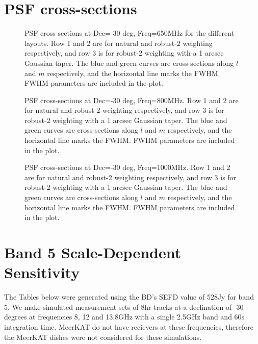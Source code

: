 \documentclass[sfheadings,a4paper,times,9pt,floats,floatfix]{article}
\begin{document}
\section{PSF cross-sections}\label{app:psf}
\begin{figure}[H]
 \tiny{}
 \caption{PSF cross-sections at Dec=-30 deg, Freq=650MHz for the different layouts. Row 1 and 2 are for natural and robust-2
weighting respectively, and row
3 is for robust-2 weighting with a 1 arcsec Gaussian taper. The blue and green curves are cross-sections along $l$ and $m$
respectively, and the horizontal line marks the FWHM. FWHM parameters are included in the plot.}
\end{figure}
\begin{figure}[H]
 \tiny{}
 \caption{PSF cross-sections at Dec=-30 deg, Freq=800MHz. Row 1 and 2 are for natural and robust-2 weighting respectively, and 
row
3 is for robust-2 weighting with a 1 arcsec Gaussian taper. The blue and green curves are cross-sections along $l$ and $m$
respectively, and the horizontal line marks the FWHM. FWHM parameters are included in the plot.}
\end{figure}
\begin{figure}[H]
 \tiny{}
 \caption{PSF cross-sections at Dec=-30 deg, Freq=1000MHz. Row 1 and 2 are for natural and robust-2 weighting respectively, and
row
3 is for robust-2 weighting with a 1 arcsec Gaussian taper. The blue and green curves are cross-sections along $l$ and $m$
respectively, and the horizontal line marks the FWHM. FWHM parameters are included in the plot.}
\end{figure}
\section{Band 5 Scale-Dependent Sensitivity}\label{sec:band5}
The Tables below were generated using the BD's SEFD value of 528Jy for band 5. We make simulated measurement sets of 8hr tracks
at a declination of -30 degrees at frequencies 8, 12 and 13.8GHz with a single 2.5GHz band and 60s integration time. MeerKAT do
not have recievers at these frequencies, therefore the MeerKAT dishes were not considered for these simulations.






\end{document}
